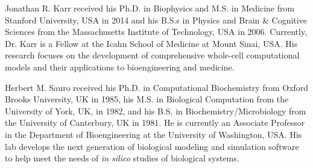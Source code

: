 \documentclass[journal,transmag,twoside]{IEEEtran}
\begin{document}
\begin{IEEEbiography}{Jonathan R. Karr}
received his Ph.D. in Biophysics and M.S. in Medicine from Stanford University, USA in 2014 and his B.S.s in Physics and Brain \& Cognitive Sciences from the Massachusetts Institute of Technology, USA in 2006. Currently, Dr. Karr is a Fellow at the Icahn School of Medicine at Mount Sinai, USA. His research focuses on the development of comprehensive whole-cell computational models and their applications to bioengineering and medicine.
\end{IEEEbiography}

\begin{IEEEbiography}{Herbert M. Sauro}
received his Ph.D. in Computational Biochemistry from Oxford Brooks University, UK in 1985, his M.S. in Biological Computation from the University of York, UK, in 1982, and his B.S. in Biochemistry/Microbiology from the University of Canterbury, UK in 1981. He is currently an Associate Professor in the Department of Bioengineering at the University of Washington, USA. His lab develops the next generation of biological modeling and simulation software to help meet the needs of \textit{in silico} studies of biological systems.
\end{IEEEbiography}

\vfill
\end{document}

